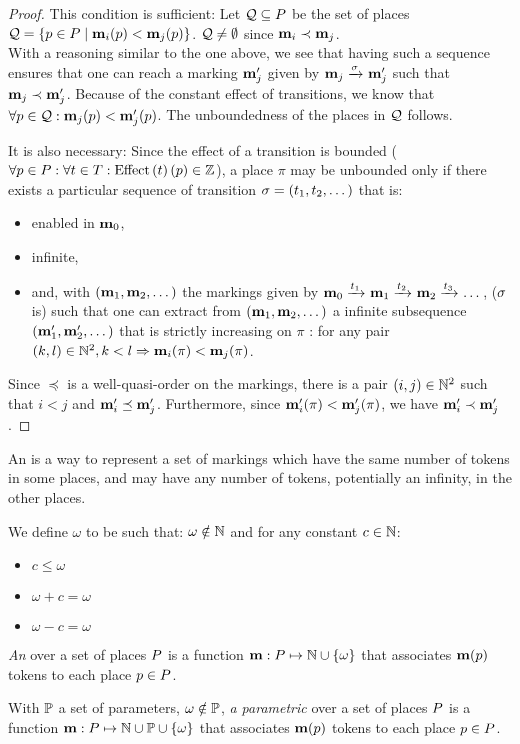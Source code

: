 \begin{proof}
  This condition is sufficient:
  Let $\mathcal{Q} \subseteq P$ be the set of places $\mathcal{Q} = \left\{p \in P \mid  \mathbf{m}_i(p) < \mathbf{m}_j(p)\right\}$.
  $\mathcal{Q} \neq \emptyset$ since $\mathbf{m}_i \prec \mathbf{m}_j$.\\
  With a reasoning similar to the one above, we see that having such a sequence ensures that one can reach a marking $\mathbf{m}'_j$ given by $\mar_j \fire{\seqt} \mar'_j$ such that $\mathbf{m}_j \prec \mathbf{m}'_j$.
  Because of the constant effect of transitions, we know that $\forall p \in \mathcal{Q} : \mathbf{m}_j(p) < \mathbf{m}'_j(p)$.
  The unboundedness of the places in $\mathcal{Q}$ follows.

  It is also necessary:
  Since the effect of a transition is bounded ($\forall p \in \places : \forall t \in \transitions : \effect{t}[p] \in \integers$), a place $\pi$ may be unbounded only if there exists a particular sequence of transition $\defInfSeqt$ that is:
  \begin{itemize} 
    \item enabled in $\mathbf{m}_0$,
    \item infinite,
    \item and, with $\bodyInfSeq[\mar]$ the markings given by $\mathbf{m}_0 \xrightarrow{t_1}_{} \mathbf{m}_1 \xrightarrow{t_2}_{} \mathbf{m}_2 \xrightarrow{t_3}_{} \dots$, ($\seqt$ is) such that one can extract from $\bodyInfSeq[\mar]$ a infinite subsequence $\bodyInfSeq[\mar']$ that is strictly increasing on $\pi$ : for any pair $(k, l) \in \mathbb{N}^2, k < l \Rightarrow \mathbf{m}_i(\pi) < \mathbf{m}_j(\pi)$.
  \end{itemize}
  Since $\preceq$ is a well-quasi-order on the markings, there is a pair $(i, j) \in \mathbb{N}^2$ such that $i < j$ and $\mathbf{m}'_i \preceq \mathbf{m}'_j$.
  Furthermore, since $\mathbf{m}'_i(\pi) < \mathbf{m}'_j(\pi)$, we have $\mathbf{m}'_i \prec \mathbf{m}'_j$.
\end{proof}

An \omark is a way to represent a set of markings which have the same number of tokens in some places, and may have any number of tokens, potentially an infinity, in the other places.

\begin{defi}[\omark]
  We define $\omega$ to be such that:
  $\omega \notin \mathbb{N}$
  and for any constant $c \in \mathbb{N}$:
  \begin{itemize}
    \item $c \leq \omega$
    \item $\omega + c = \omega$
    \item $\omega - c = \omega$
  \end{itemize}

  \emph{An \omark} \mar over a set of places $P$ is a function $\mathbf{m} : P \mapsto \mathbb{N} \cup \{\omega\}$ that associates $\mathbf{m}(p)$ tokens to each place $p \in P$.

  With $\mathbb{P}$ a set of parameters, $\omega \notin \mathbb{P}$,
  \emph{a parametric \omark} \mar over a set of places $P$ is a function $\mathbf{m} : P \mapsto \mathbb{N} \cup \mathbb{P} \cup \{\omega\}$ that associates $\mathbf{m}(p)$ tokens to each place $p \in P$.
\end{defi}

